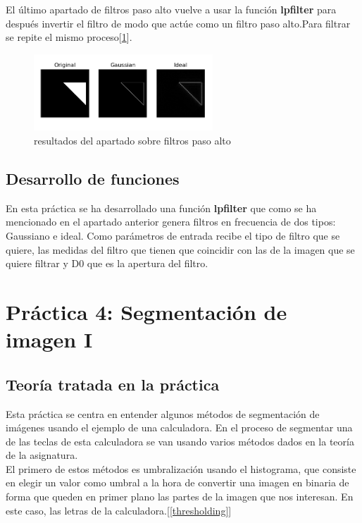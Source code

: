 \documentclass[a4paper,12pt]{report}
\begin{document}
El último apartado de filtros paso alto vuelve a usar la función \textbf{lpfilter} para después invertir el filtro de modo que actúe como un filtro paso alto.Para filtrar se repite el mismo proceso[\ref{fpa}].

\begin{figure}[h]
\centering
\includegraphics[width=0.6\textwidth]{imagenes/fpa}
\caption{resultados del apartado sobre filtros paso alto}
\label{fpa}
\end{figure}

\subsection{Desarrollo de funciones}

En esta práctica se ha desarrollado una función \textbf{lpfilter} que como se ha mencionado en el apartado anterior genera filtros en frecuencia de dos tipos: Gaussiano e ideal. Como parámetros de entrada recibe el tipo de filtro que se quiere, las medidas del filtro que tienen que coincidir con las de la imagen que se quiere filtrar y D0 que es la apertura del filtro.\\

\section{ Práctica 4: Segmentación de imagen I}
\subsection{Teoría tratada en la práctica}

Esta práctica se centra en entender algunos métodos de segmentación de imágenes usando el ejemplo de una calculadora. En el proceso de segmentar una de las teclas de esta calculadora se van usando varios métodos dados en la teoría de la asignatura.\\

El primero de estos métodos es umbralización usando el histograma, que consiste en elegir un valor como umbral a la hora de convertir una imagen en binaria de forma que queden en primer plano las partes de la imagen que nos interesan. En este caso, las letras de la calculadora.[\ref{thresholding}]\\
\end{document}
